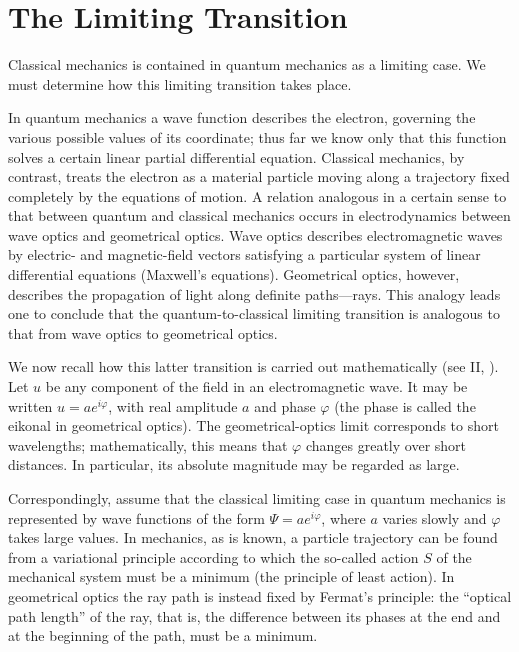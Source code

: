 \section{The Limiting Transition}

Classical mechanics is contained in quantum mechanics as a limiting case. We
must determine how this limiting transition takes place.

In quantum mechanics a wave function describes the electron, governing the
various possible values of its coordinate; thus far we know
only that this function solves a certain linear partial differential equation.
Classical mechanics, by contrast, treats the electron as a material particle
moving along a trajectory fixed completely by the equations of motion. A
relation analogous in a certain sense to that between quantum and classical
mechanics occurs in electrodynamics between wave optics and geometrical
optics. Wave optics describes electromagnetic waves by electric- and
magnetic-field vectors satisfying a particular system of linear differential
equations (Maxwell's equations). Geometrical optics, however,%
describes the propagation of light along definite paths---rays. This analogy
leads one to conclude that the quantum-to-classical limiting transition is
analogous to that from wave optics to geometrical optics.

We now recall how this latter transition is carried out mathematically (see II,
). Let $u$ be any component of the field in an electromagnetic wave. It
may be written $u=ae^{i\varphi}$, with real amplitude $a$ and phase $\varphi$
(the phase is called the eikonal in geometrical optics). The geometrical-optics
limit corresponds to short wavelengths; mathematically, this means that
$\varphi$ changes greatly over short distances. In particular, its absolute
magnitude may be regarded as large.

Correspondingly, assume that the classical limiting case in quantum mechanics
is represented by wave functions of the form $\Psi=ae^{i\varphi}$, where $a$
varies slowly and $\varphi$ takes large values. In mechanics, as is known, a
particle trajectory can be found from a variational principle according to
which the so-called action $S$ of the mechanical system must be a minimum (the
principle of least action). In geometrical optics the ray path is instead
fixed by Fermat's principle: the ``optical path length'' of the ray, that is,
the difference between its phases at the end and at the beginning of the path,
must be a minimum.

